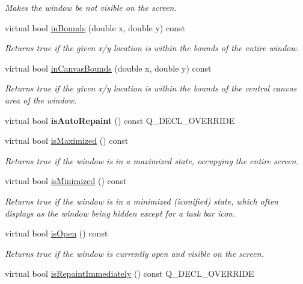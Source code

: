 \begin{DoxyCompactItemize}
\begin{DoxyCompactList}\small\item\em Makes the window be not visible on the screen. \end{DoxyCompactList}\item 
virtual bool \mbox{\hyperlink{classGWindow_afc480f652b8c5f1fb255e2269ce68879}{in\+Bounds}} (double x, double y) const
\begin{DoxyCompactList}\small\item\em Returns true if the given x/y location is within the bounds of the entire window. \end{DoxyCompactList}\item 
virtual bool \mbox{\hyperlink{classGWindow_ae94c9ea850cba190c985dae9fc120d32}{in\+Canvas\+Bounds}} (double x, double y) const
\begin{DoxyCompactList}\small\item\em Returns true if the given x/y location is within the bounds of the central canvas area of the window. \end{DoxyCompactList}\item 
virtual bool {\bfseries is\+Auto\+Repaint} () const Q\+\_\+\+D\+E\+C\+L\+\_\+\+O\+V\+E\+R\+R\+I\+DE
\item 
virtual bool \mbox{\hyperlink{classGWindow_a28e910de88f3ff5419710b0b0a03c2bb}{is\+Maximized}} () const
\begin{DoxyCompactList}\small\item\em Returns true if the window is in a maximized state, occupying the entire screen. \end{DoxyCompactList}\item 
virtual bool \mbox{\hyperlink{classGWindow_a14e6f95fa2c9ec543caa7f16f30c53d6}{is\+Minimized}} () const
\begin{DoxyCompactList}\small\item\em Returns true if the window is in a minimized (iconified) state, which often displays as the window being hidden except for a task bar icon. \end{DoxyCompactList}\item 
virtual bool \mbox{\hyperlink{classGWindow_a002ed331862370f434b7befe331b5a0b}{is\+Open}} () const
\begin{DoxyCompactList}\small\item\em Returns true if the window is currently open and visible on the screen. \end{DoxyCompactList}\item 
virtual bool \mbox{\hyperlink{classGWindow_ae88344ee919d3d3de6e38a8381faf209}{is\+Repaint\+Immediately}} () const Q\+\_\+\+D\+E\+C\+L\+\_\+\+O\+V\+E\+R\+R\+I\+DE

\end{DoxyCompactItemize}
